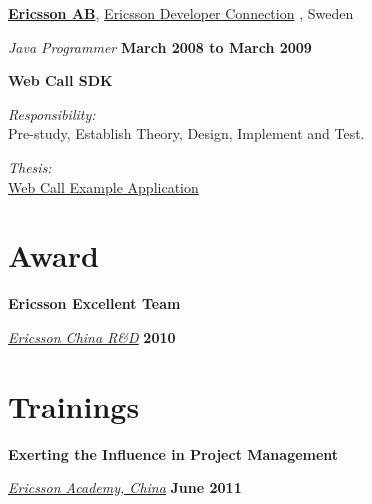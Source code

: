 %
\href{http://www.ericsson.com/}{\textbf{Ericsson AB}}, \href{http://www.ericsson.com/developer}{Ericsson Developer Connection} ,
Sweden
\begin{outerlist}

\item[] \textit{Java Programmer}%
        \hfill \textbf{March 2008 to March 2009}

\item[] {\textbf{Web Call SDK}}
\begin{outerlist}
\item \textit{Responsibility:}\\
Pre-study, Establish Theory, Design, Implement and Test. 
\item \textit{Thesis:}\\
\href{http://shanbohomepage.googlecode.com/hg/master_thesis/master_thesis.pdf}{Web Call Example Application}
\end{outerlist}
\end{outerlist}
\blankline



\section{Award}
\textbf{Ericsson Excellent Team}
\begin{outerlist}
\item[] \href{http://www.ericsson.com/}{\textit{Ericsson China R\&D}}
        \hfill \textbf{2010}
\end{outerlist}


\section{Trainings}
\textbf{Exerting the Influence in Project Management}
\begin{outerlist}
\item[] \href{http://www.ericssonacademy.com/}{\textit{Ericsson Academy, China}}
        \hfill \textbf{June 2011}
\end{outerlist}
\blankline

